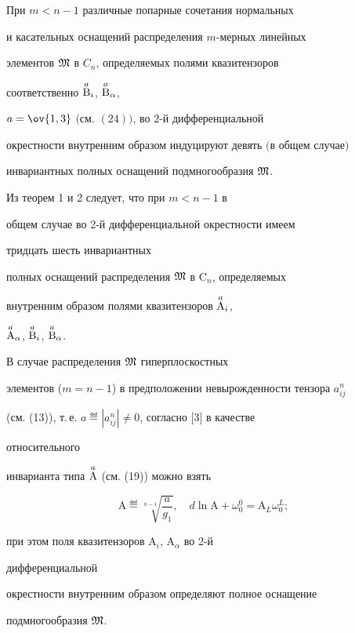  


\begin{thm} 


При $m<n-1$ различные попарные сочетания нормальных 


и касательных оснащений распределения $m$-мерных линейных 


элементов $\frak M$ в $C_n$, определяемых полями квазитензоров 


соответственно $\overset{a}{\mathrm B}{}_i$, $\overset{a}{\mathrm B}{}_\alpha$, 


$a=\ov{1,3}$ $($см. $(24))$, во $2$-й дифференциальной 


окрестности внутренним образом индуцируют девять $($в общем случае$)$ 


инвариантных полных оснащений подмногообразия $\frak M$. 


\end{thm} 


 


\begin{note} 


Из теорем 1 и 2 следует, что при $m<n-1$ в 


общем случае во 2-й дифференциальной окрестности имеем 


тридцать шесть инвариантных 


полных оснащений распределения $\frak M$ в $\mathrm C_n$, определяемых 


внутренним образом полями квазитензоров $\overset{a}{\mathrm A}{}_i$, 


$\up{a}{\mathrm A}_\alpha$, $\up{a}{\mathrm B}_i$, $\up{a}{\mathrm 


B}_\alpha$. 


\end{note} 


 


\begin{note} 


В случае распределения $\frak M$ гиперплоскостных 


элементов ($m=n-1$) в предположении невырожденности тензора $a^n_{i j}$ 


(см. (13)), т.\,е. $a\eqdef|a^n_{i j}|\ne0$, согласно [3] в качестве 


относительного 


инварианта типа $\overset{a}{\mathrm A}{}$ (см. (19)) можно взять 


$$ 


\mathrm A\eqdef\sqrt[n-1]{\frac{a}{g_1}},\quad 


d\ln\mathrm A+\omega^0_0=\mathrm A_L\omega^L_0; 


$$ 


при этом поля квазитензоров $\mathrm A_i$, $\mathrm A_\alpha$ во 2-й 


дифференциальной 


окрестности внутренним образом определяют полное оснащение 


подмногообразия $\frak M$. 


\end{note} 


